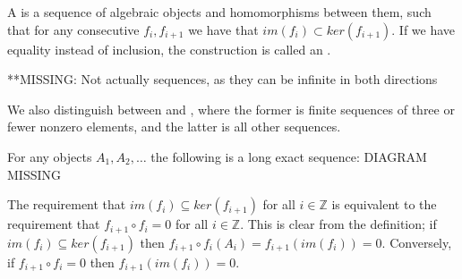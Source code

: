 \begin{definition}
A  is a sequence of algebraic objects and homomorphisms between them, such that for any consecutive $f_{i},f_{i+1}$ we have that $im(f_i)\subset ker(f_{i+1})$. If we have equality instead of inclusion, the construction is called an .
\end{definition}

**MISSING: Not actually sequences, as they can be infinite in both directions

We also distinguish between  and , where the former is finite sequences of three or fewer nonzero elements, and the latter is all other sequences.

\begin{example}
For any objects $A_1,A_2,\dots$ the following is a long exact sequence:
DIAGRAM MISSING
\end{example}

\begin{remark}
The requirement that $im(f_i)\subseteq ker(f_{i+1})$ for all $i\in \mathbb{Z}$ is equivalent to the requirement that $f_{i+1}\circ f_i=0$ for all $i\in \mathbb{Z}$. This is clear from the definition; if $im(f_i)\subseteq ker(f_{i+1})$ then $f_{i+1}\circ f_i (A_i)=f_{i+1}(im(f_i))=0$. Conversely, if $f_{i+1}\circ f_i=0$ then $f_{i+1}(im(f_i))=0$.
\end{remark}

\begin{lemma}

\end{lemma}